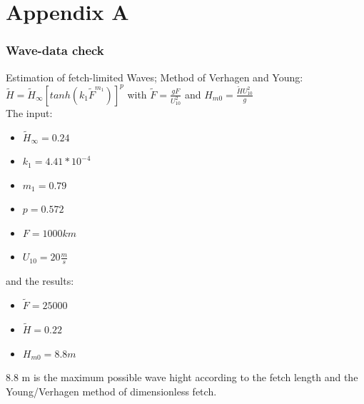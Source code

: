 \chapter{Appendix A}

 \subsection{Wave-data check}
 
Estimation of fetch-limited Waves; Method of Verhagen and Young: \\
$ \tilde{H}=\tilde{H}_{\infty}[tanh(k_1 \tilde{F}^{m_1})]^p $ with $ \tilde{F}= \frac{g F}{U_{10}^2} $ and $H_{m0} = \frac{\tilde{H} U_{10}^2}{g} $ \\
The input:
\begin{itemize}
\item $\tilde{H}_{\infty}= 0.24 $
\item $k_1= 4.41*10^{-4} $
\item $ m_1= 0.79 $
\item $p= 0.572 $
\item $F= 1000 km $
\item $U_{10}= 20 \frac{m}{s} $
\end{itemize}
 and the results:
 \begin{itemize}
 \item $\tilde{F}=25000 $
 \item $\tilde{H}= 0.22 $
 \item $H_{m0}= 8.8 m $
 \end{itemize}
 8.8 m is the maximum possible wave hight according to the fetch length and the Young/Verhagen method of dimensionless fetch.
